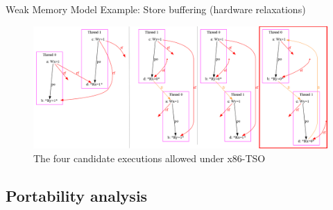 \documentclass{beamer}
\begin{document}
\begin{frame}{Weak Memory Model} {Example: Store buffering (hardware relaxations)}

\vspace{10pt}
\begin{minipage}{.3\linewidth}
\hfill
\end{minipage}
%
\noindent\begin{minipage}{.4\linewidth}
\end{minipage}
%


\vspace{-5pt}
\begin{figure}
\centering
\includegraphics[width=\linewidth]{img/candidate-red.png}
\caption{The four candidate executions allowed under x86-TSO}
\end{figure}

\end{frame}



\subsection{Portability analysis}
\end{document}
